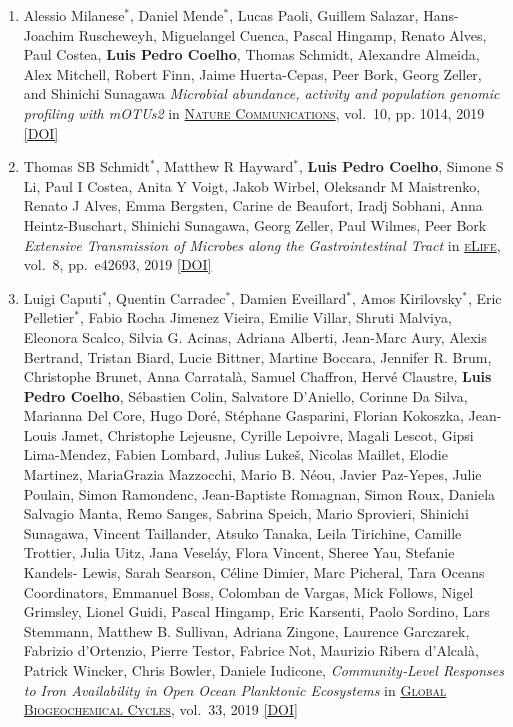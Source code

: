 \documentclass{article}
\newcommand\showdoi[1]{%
    \href{http://dx.doi.org/#1}{[DOI]}%
}
\newcommand\pubname[1]{\textsc{\uline{#1}}}
\newcommand\contribution[1]{\relax}
\newcommand\costar{${}^{*}$}
\begin{document}
\begin{enumerate}[resume]
\item Alessio Milanese\costar, Daniel Mende\costar, Lucas Paoli, Guillem
Salazar, Hans-Joachim Ruscheweyh, Miguelangel Cuenca, Pascal Hingamp, Renato
Alves, Paul Costea, \textbf{Luis Pedro Coelho}, Thomas Schmidt, Alexandre
Almeida, Alex Mitchell, Robert Finn, Jaime Huerta-Cepas, Peer Bork, Georg
Zeller, and Shinichi Sunagawa \emph{Microbial abundance, activity and
population genomic profiling with mOTUs2} in \pubname{Nature Communications},
vol.\ 10, pp. 1014, 2019 \showdoi{10.1038/s41467-019-08844-4}

\item Thomas SB Schmidt\costar, Matthew R Hayward\costar, \textbf{Luis Pedro
Coelho}, Simone S Li, Paul I Costea, Anita Y Voigt, Jakob Wirbel, Oleksandr M
Maistrenko, Renato J Alves, Emma Bergsten, Carine de Beaufort, Iradj Sobhani,
Anna Heintz-Buschart, Shinichi Sunagawa, Georg Zeller, Paul Wilmes, Peer Bork
\emph{Extensive Transmission of Microbes along the Gastrointestinal Tract} in
\pubname{eLife}, vol.\ 8, pp.\ e42693, 2019 \showdoi{10.7554/eLife.42693}

\item Luigi Caputi\costar, Quentin Carradec\costar, Damien Eveillard\costar,
Amos Kirilovsky\costar, Eric Pelletier\costar, Fabio Rocha Jimenez Vieira,
Emilie Villar, Shruti Malviya, Eleonora Scalco, Silvia G. Acinas, Adriana
Alberti, Jean-Marc Aury, Alexis Bertrand, Tristan Biard, Lucie Bittner, Martine
Boccara, Jennifer R. Brum, Christophe Brunet, Anna Carratalà, Samuel Chaffron,
Hervé Claustre, \textbf{Luis Pedro Coelho}, Sébastien Colin, Salvatore
D'Aniello, Corinne Da Silva, Marianna Del Core, Hugo Doré, Stéphane Gasparini,
Florian Kokoszka, Jean-Louis Jamet, Christophe Lejeusne, Cyrille Lepoivre,
Magali Lescot, Gipsi Lima-Mendez, Fabien Lombard, Julius Lukeš, Nicolas
Maillet, Elodie Martinez, MariaGrazia Mazzocchi, Mario B. Néou, Javier
Paz-Yepes, Julie Poulain, Simon Ramondenc, Jean-Baptiste Romagnan, Simon Roux,
Daniela Salvagio Manta, Remo Sanges, Sabrina Speich, Mario Sprovieri, Shinichi
Sunagawa, Vincent Taillander, Atsuko Tanaka, Leila Tirichine, Camille Trottier,
Julia Uitz, Jana Veseláy, Flora Vincent, Sheree Yau, Stefanie Kandels- Lewis,
Sarah Searson, Céline Dimier, Marc Picheral, Tara Oceans Coordinators, Emmanuel
Boss, Colomban de Vargas, Mick Follows, Nigel Grimsley, Lionel Guidi, Pascal
Hingamp, Eric Karsenti, Paolo Sordino, Lars Stemmann, Matthew B. Sullivan,
Adriana Zingone, Laurence Garczarek, Fabrizio d'Ortenzio, Pierre Testor,
Fabrice Not, Maurizio Ribera d'Alcalà, Patrick Wincker, Chris Bowler, Daniele
Iudicone, \emph{Community‐Level Responses to Iron Availability in Open Ocean
Planktonic Ecosystems} in \pubname{Global Biogeochemical Cycles}, vol.\ 33,
2019 \showdoi{10.1029/2018GB006022}
\contribution{I contributed to data analysis (of metatranscriptomics and
imaging data).}


\end{enumerate}
\end{document}
